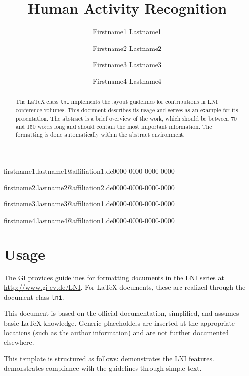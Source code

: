 \documentclass[biblatex]{lni}
\begin{document}
\title[A Short Title]{Human Activity Recognition}

\author[1]{Firstname1 Lastname1}{firstname1.lastname1@affiliation1.de}{0000-0000-0000-0000}
\author[2]{Firstname2 Lastname2}{firstname2.lastname2@affiliation2.de}{0000-0000-0000-0000}
\author[1]{Firstname3 Lastname3}{firstname3.lastname3@affiliation1.de}{0000-0000-0000-0000}
\author[1]{Firstname4 Lastname4}{firstname4.lastname4@affiliation1.de}{0000-0000-0000-0000}%
\maketitle

\begin{abstract}
The \LaTeX{} class \texttt{lni} implements the layout guidelines for contributions in LNI conference volumes.
This document describes its usage and serves as an example for its presentation.
The abstract is a brief overview of the work, which should be between 70 and 150 words long and should contain the most important information.
The formatting is done automatically within the abstract environment.
\end{abstract}


\section{Usage}
The GI provides guidelines for formatting documents in the LNI series at \url{http://www.gi-ev.de/LNI}.
For \LaTeX{} documents, these are realized through the document class \texttt{lni}.

This document is based on the official documentation, simplified, and assumes basic LaTeX knowledge.
Generic placeholders are inserted at the appropriate locations (such as the author information) and are not further documented elsewhere.

This template is structured as follows:
 demonstrates the LNI features.
 demonstrates compliance with the guidelines through simple text.
\end{document}

